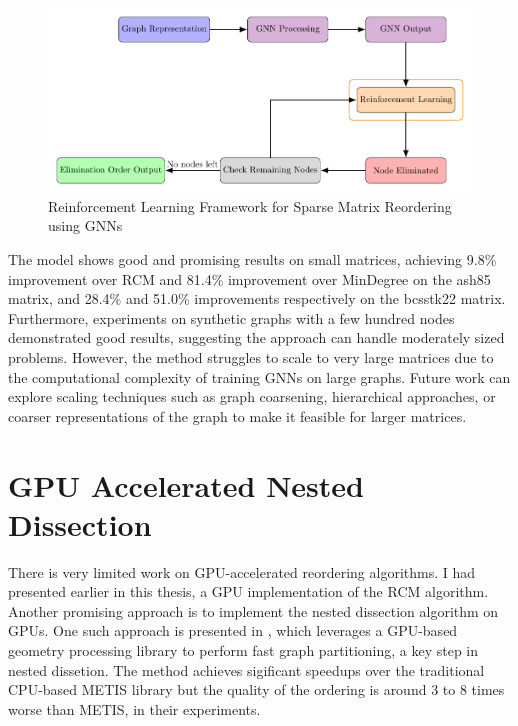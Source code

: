 \begin{figure}[h]
    \centering
    \includegraphics[width=\textwidth]{fig/other/diagram.pdf}
    \caption{Reinforcement Learning Framework for Sparse Matrix Reordering using GNNs}
    \label{fig:rl_method}
\end{figure}

The model shows good and promising results on small matrices, achieving 9.8\% improvement over RCM and 81.4\% improvement over MinDegree on the ash85 matrix, and 28.4\% and 51.0\% improvements respectively on the bcsstk22 matrix. Furthermore, experiments on synthetic graphs with a few hundred nodes demonstrated good results, suggesting the approach can handle moderately sized problems. However, the method struggles to scale to very large matrices due to the computational complexity of training GNNs on large graphs. Future work can explore scaling techniques such as graph coarsening, hierarchical approaches, or coarser representations of the graph to make it feasible for larger matrices.

\section{GPU Accelerated Nested Dissection}

There is very limited work on GPU-accelerated reordering algorithms. I had presented earlier in this thesis, a GPU implementation of the RCM algorithm. Another promising approach is to implement the nested dissection algorithm on GPUs. One such approach is presented in \cite{yuan_fast_nodate}, which leverages a GPU-based geometry processing library to perform fast graph partitioning, a key step in nested dissetion. The method achieves sigificant speedups over the traditional CPU-based METIS library but the quality of the ordering is around 3 to 8 times worse than METIS, in their experiments.

